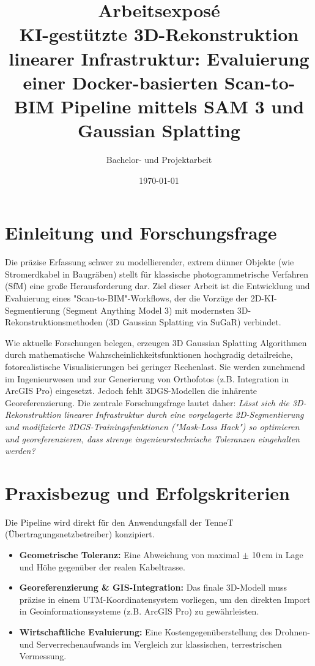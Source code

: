 \documentclass[12pt,a4paper]{article}
\title{\textbf{Arbeitsexposé}\\KI-gestützte 3D-Rekonstruktion linearer Infrastruktur: Evaluierung einer Docker-basierten Scan-to-BIM Pipeline mittels SAM 3 und Gaussian Splatting}
\author{Bachelor- und Projektarbeit}
\date{\today}
\begin{document}
\maketitle

\section{Einleitung und Forschungsfrage}
Die präzise Erfassung schwer zu modellierender, extrem dünner Objekte (wie Stromerdkabel in Baugräben) stellt für klassische photogrammetrische Verfahren (SfM) eine große Herausforderung dar. Ziel dieser Arbeit ist die Entwicklung und Evaluierung eines "Scan-to-BIM"-Workflows, der die Vorzüge der 2D-KI-Segmentierung (Segment Anything Model 3) mit modernsten 3D-Rekonstruktionsmethoden (3D Gaussian Splatting via SuGaR) verbindet.

Wie aktuelle Forschungen belegen, erzeugen 3D Gaussian Splatting Algorithmen durch mathematische Wahrscheinlichkeitsfunktionen hochgradig detailreiche, fotorealistische Visualisierungen bei geringer Rechenlast. Sie werden zunehmend im Ingenieurwesen und zur Generierung von Orthofotos (z.B. Integration in ArcGIS Pro) eingesetzt. Jedoch fehlt 3DGS-Modellen die inhärente Georeferenzierung.
Die zentrale Forschungsfrage lautet daher: \textit{Lässt sich die 3D-Rekonstruktion linearer Infrastruktur durch eine vorgelagerte 2D-Segmentierung und modifizierte 3DGS-Trainingsfunktionen ("Mask-Loss Hack") so optimieren und georeferenzieren, dass strenge ingenieurstechnische Toleranzen eingehalten werden?}

\section{Praxisbezug und Erfolgskriterien}
Die Pipeline wird direkt für den Anwendungsfall der TenneT (Übertragungsnetzbetreiber) konzipiert.
\begin{itemize}
    \item \textbf{Geometrische Toleranz:} Eine Abweichung von maximal $\pm$ 10\,cm in Lage und Höhe gegenüber der realen Kabeltrasse.
    \item \textbf{Georeferenzierung \& GIS-Integration:} Das finale 3D-Modell muss präzise in einem UTM-Koordinatensystem vorliegen, um den direkten Import in Geoinformationssysteme (z.B. ArcGIS Pro) zu gewährleisten.
    \item \textbf{Wirtschaftliche Evaluierung:} Eine Kostengegenüberstellung des Drohnen- und Serverrechenaufwands im Vergleich zur klassischen, terrestrischen Vermessung.
\end{itemize}
\end{document}
